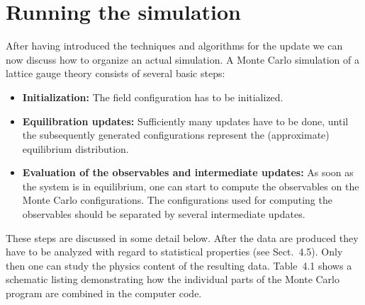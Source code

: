 \section{Running the simulation}

After having introduced the techniques and algorithms for the update we can
now discuss how to organize an actual simulation. A Monte Carlo simulation
of a lattice gauge theory consists of several basic steps:

\begin{itemize}
  \item \textbf{Initialization:} The field configuration has to be initialized.
  \item \textbf{Equilibration updates:} Sufficiently many updates have to be done, until
        the subsequently generated configurations represent the (approximate)
        equilibrium distribution.
  \item \textbf{Evaluation of the observables and intermediate updates:} As soon as
        the system is in equilibrium, one can start to compute the observables on
        the Monte Carlo configurations. The configurations used for computing
        the observables should be separated by several intermediate updates.
\end{itemize}

These steps are discussed in some detail below. After the data are produced
they have to be analyzed with regard to statistical properties (see Sect.~4.5).
Only then one can study the physics content of the resulting data.
Table~4.1 shows a schematic listing demonstrating how the individual parts
of the Monte Carlo program are combined in the computer code.

